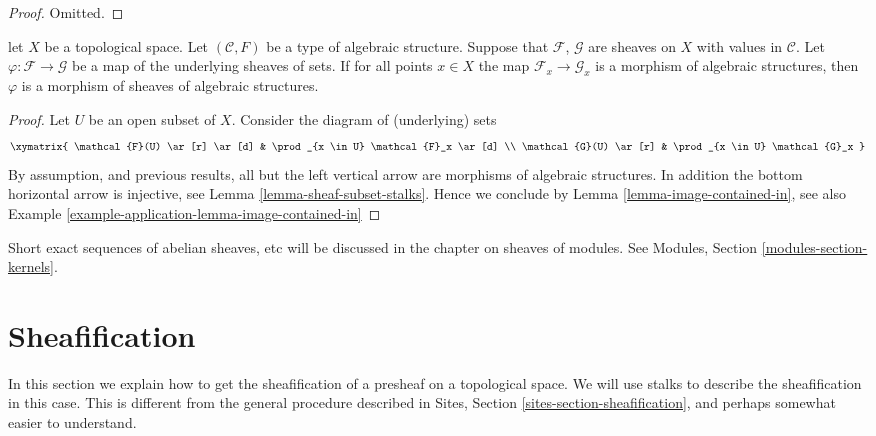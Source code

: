 \begin{proof}
Omitted.
\end{proof}


\begin{lemma}
\label{lemma-check-homomorphism-stalks}
let $X$ be a topological space.
Let $(\mathcal{C}, F)$ be a type of algebraic structure.
Suppose that $\mathcal{F}$, $\mathcal{G}$ are sheaves on $X$
with values in $\mathcal{C}$.
Let $\varphi : \mathcal{F} \to \mathcal{G}$
be a map of the underlying sheaves of sets.
If for all points $x \in X$ the map
$\mathcal{F}_x \to \mathcal{G}_x$
is a morphism of algebraic structures,
then $\varphi$ is a morphism of sheaves of algebraic structures.
\end{lemma}

\begin{proof}
Let $U$ be an open subset of $X$. Consider the diagram of
(underlying) sets
$$
\xymatrix{
\mathcal{F}(U) \ar[r] \ar[d] &
\prod_{x \in U} \mathcal{F}_x \ar[d] \\
\mathcal{G}(U) \ar[r] &
\prod_{x \in U} \mathcal{G}_x
}
$$
By assumption, and previous results, all but the left vertical
arrow are morphisms of algebraic structures. In addition the
bottom horizontal arrow is injective,
see Lemma \ref{lemma-sheaf-subset-stalks}.
Hence we conclude by Lemma \ref{lemma-image-contained-in},
see also Example \ref{example-application-lemma-image-contained-in}
\end{proof}

\noindent
Short exact sequences of abelian sheaves, etc will be discussed
in the chapter on sheaves of modules. See
Modules, Section \ref{modules-section-kernels}.




\section{Sheafification}
\label{section-sheafification}

\noindent
In this section we explain how to get the sheafification
of a presheaf on a topological space. We will use stalks
to describe the sheafification in this case. This is different
from the general procedure described in Sites, Section
\ref{sites-section-sheafification}, and perhaps somewhat
easier to understand.

